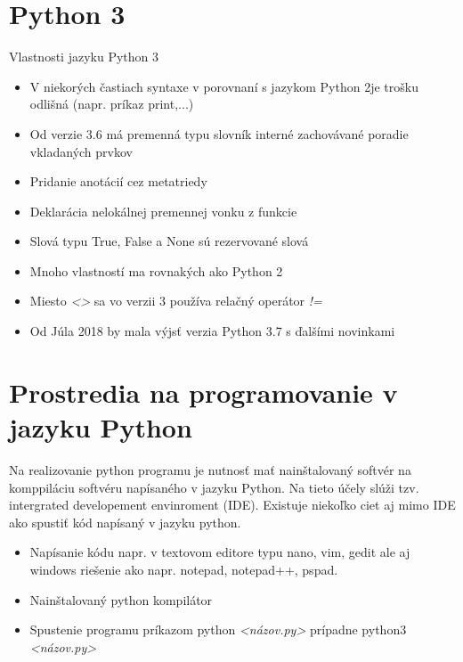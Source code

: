 \section{Python 3}
Vlastnosti jazyku Python 3\cite{Python3}\begin{itemize}
\item V niekorých častiach syntaxe v porovnaní s jazykom Python 2je trošku odlišná (napr. príkaz print,...)
\item Od verzie 3.6 má premenná typu slovník interné zachovávané poradie vkladaných prvkov
\item Pridanie anotácií cez metatriedy
\item Deklarácia nelokálnej premennej vonku z funkcie
\item Slová typu True, False a None sú rezervované slová
\item Mnoho vlastností ma rovnakých ako Python 2
\item Miesto \textit{<>} sa vo verzii 3 používa relačný operátor \textit{!=}
\item Od Júla 2018 by mala výjsť verzia Python 3.7 s ďalšími novinkami 
\end{itemize}
\section{Prostredia na programovanie v jazyku Python}
Na realizovanie python programu je nutnosť mať nainštalovaný softvér na komppiláciu softvéru napísaného v jazyku Python. Na tieto účely slúži tzv. intergrated developement envinroment (IDE). Existuje niekoľko ciet aj mimo IDE ako spustiť kód napísaný v jazyku python.\begin{itemize}
\item Napísanie kódu napr. v textovom editore typu nano, vim, gedit ale aj windows riešenie ako napr. notepad, notepad++, pspad.
\item Nainštalovaný python kompilátor
\item Spustenie programu príkazom python \textit{<názov.py>} prípadne python3 \textit{<názov.py>}
\end{itemize}
